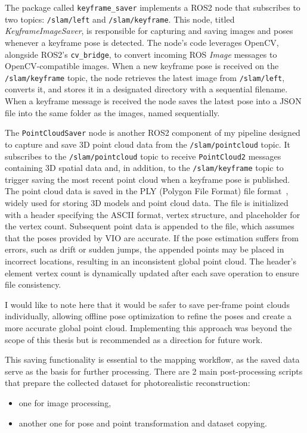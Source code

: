The package called \verb|keyframe_saver| implements a ROS2 node that subscribes to two topics: \verb|/slam/left| and \verb|/slam/keyframe|. This node, titled \textit{KeyframeImageSaver}, is responsible for capturing and saving images and poses whenever a keyframe pose is detected. The node’s code leverages OpenCV, alongside ROS2's \verb|cv_bridge|, to convert incoming ROS \textit{Image} messages to OpenCV-compatible images. When a new keyframe pose is received on the \verb|/slam/keyframe| topic, the node retrieves the latest image from \verb|/slam/left|, converts it, and stores it in a designated directory with a sequential filename. When a keyframe message is received the node saves the latest pose into a JSON file into the same folder as the images, named sequentially.

The \verb|PointCloudSaver| node is another ROS2 component of my pipeline designed to capture and save 3D point cloud data from the \verb|/slam/pointcloud| topic. It subscribes to the \verb|/slam/pointcloud| topic to receive \verb|PointCloud2| messages containing 3D spatial data and, in addition, to the \verb|/slam/keyframe| topic to trigger saving the most recent point cloud when a keyframe pose is published. The point cloud data is saved in the PLY (Polygon File Format) file format~\cite{ply_format}, widely used for storing 3D models and point cloud data. The file is initialized with a header specifying the ASCII format, vertex structure, and placeholder for the vertex count. Subsequent point data is appended to the file, which assumes that the poses provided by VIO are accurate. If the pose estimation suffers from errors, such as drift or sudden jumps, the appended points may be placed in incorrect locations, resulting in an inconsistent global point cloud. The header's element vertex count is dynamically updated after each save operation to ensure file consistency.

I would like to note here that it would be safer to save per-frame point clouds individually, allowing offline pose optimization to refine the poses and create a more accurate global point cloud. Implementing this approach was beyond the scope of this thesis but is recommended as a direction for future work.

This saving functionality is essential to the mapping workflow, as the saved data serve as the basis for further processing. There are 2 main post-processing scripts that prepare the collected dataset for photorealistic reconstruction:
\begin{itemize}
    \item one for image processing,
    \item another one for pose and point transformation and dataset copying.
\end{itemize}

